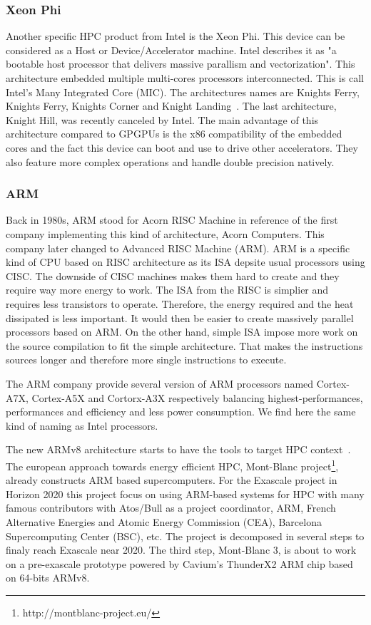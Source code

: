 \subsubsection{Xeon Phi}
Another specific HPC product from Intel is the Xeon Phi. 
This device can be considered as a Host or Device/Accelerator machine. 
Intel describes it as "a bootable host processor that delivers massive parallism and vectorization".
This architecture embedded multiple multi-cores processors interconnected. 
This is call Intel's Many Integrated Core (MIC).
The architectures names are Knights Ferry, Knights Ferry, Knights Corner and Knight Landing~\cite{sodani2016knights}. 
The last architecture, Knight Hill, was recently canceled by Intel. 
The main advantage of this architecture compared to GPGPUs is the x86 compatibility of the embedded cores and the fact this device can boot and use to drive other accelerators. 
They also feature more complex operations and handle double precision natively. 

\subsubsection{ARM}
Back in 1980s, ARM stood for Acorn RISC Machine in reference of the first company implementing this kind of architecture, Acorn Computers. 
This company later changed to Advanced RISC Machine (ARM). 
ARM is a specific kind of CPU based on RISC architecture as its ISA depsite usual processors using CISC.
The downside of CISC machines makes them hard to create and they require way more energy to work. 
The ISA from the RISC is simplier and requires less transistors to operate. 
Therefore, the energy required and the heat dissipated is less important. 
It would then be easier to create massively parallel processors based on ARM. 
On the other hand, simple ISA impose more work on the source compilation to fit the simple architecture. 
That makes the instructions sources longer and therefore more single instructions to execute. 

The ARM company provide several version of ARM processors named Cortex-A7X, Cortex-A5X and Cortorx-A3X respectively balancing highest-performances, performances and efficiency and less power consumption. 
We find here the same kind of naming as Intel processors. 

The new ARMv8 architecture starts to have the tools to target HPC context~\cite{rico2017arm}.
The european approach towards energy efficient HPC, Mont-Blanc project\footnote{http://montblanc-project.eu/}, already constructs ARM based supercomputers. 
For the Exascale project in Horizon 2020 this project focus on using ARM-based systems for HPC with many famous contributors with Atos/Bull as a project coordinator, ARM, French Alternative Energies and Atomic Energy Commission (CEA), Barcelona Supercomputing Center (BSC), etc.
The project is decomposed in several steps to finaly reach Exascale near 2020. 
The third step, Mont-Blanc 3, is about to work on a pre-exascale prototype powered by Cavium’s ThunderX2 ARM chip based on 64-bits ARMv8.

